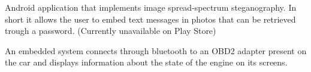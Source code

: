 \documentclass[11 pt,oneside,a4paper,titlepage]{article}
\begin{document}
{\begin{minipage}{11.3cm}
    \vspace*{0.22cm}
    \personalProject{--}
    {
        Android application that implements image spread-spectrum steganography. 
        In short it allows the user to embed text messages in photos 
        that can be retrieved trough a password.
        (Currently unavailable on Play Store)
    }

    \vspace*{0.22cm}
    {
        An embedded system connects through bluetooth to an OBD2 adapter present on 
        the car and displays information about the state of the engine on its screens.
    }	
    
    
    
    
    

\end{minipage}}
\end{document}
